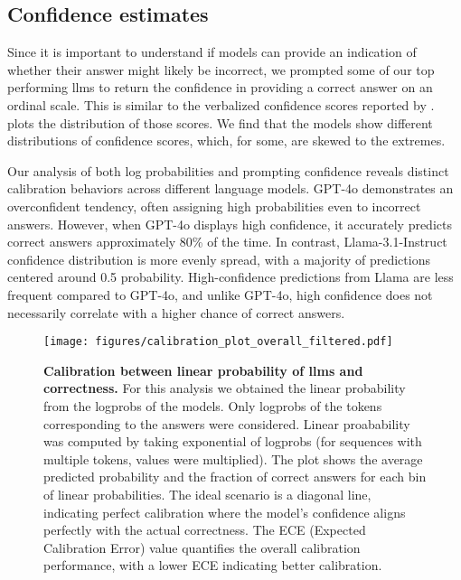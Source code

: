 \subsection{Confidence estimates} \label{sec:confidence_estimates}

Since it is important to understand if models can provide an indication of whether their answer might likely be incorrect, we prompted some of our top performing \glspl{llm} to return the confidence in providing a correct answer on an ordinal scale. 
This is similar to the verbalized confidence scores reported by \textcite{xiong2023llms}.
 plots the distribution of those scores.
We find that the models show different distributions of confidence scores, which, for some, are skewed to the extremes.

Our analysis of both log probabilities and prompting confidence reveals distinct calibration behaviors across different language models. 
GPT-4o demonstrates an overconfident tendency, often assigning high probabilities even to incorrect answers. 
However, when GPT-4o displays high confidence, it accurately predicts correct answers approximately 80\% of the time. In contrast, Llama-3.1-Instruct confidence distribution is more evenly spread, with a majority of predictions centered around 0.5 probability. High-confidence predictions from Llama are less frequent compared to GPT-4o, and unlike GPT-4o, high confidence does not necessarily correlate with a higher chance of correct answers.
\begin{figure}[htb] 
    \centering
    \texttt{[image: figures/calibration\_plot\_overall\_filtered.pdf]}
    \caption{\textbf{Calibration between linear probability of \glspl{llm} and correctness.} For this analysis we obtained the linear probability from the logprobs of the models. Only logprobs of the tokens corresponding to the answers were considered. Linear proabability was computed by taking exponential of logprobs (for sequences with multiple tokens, values were multiplied).  The plot shows the average predicted probability and the fraction of correct answers for each bin of linear probabilities. The ideal scenario is a diagonal line, indicating perfect calibration where the model's confidence aligns perfectly with the actual correctness. The ECE (Expected Calibration Error) value quantifies the overall calibration performance, with a lower ECE indicating better calibration.}
    \label{fig:confidence_score_distributions}
\end{figure}



